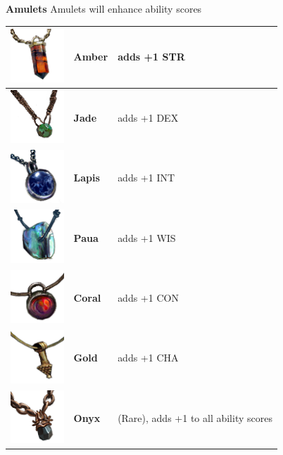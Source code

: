 

\textbf{Amulets} Amulets will enhance ability scores \\
\begin{tabular}{m{2cm}m{3cm}m{4cm} } \hline
	\includegraphics[width=2cm]{../Pictures/Gameplay/Items/Wearables/Amulets/Amber_amulet_icon.png} & \textbf{Amber} & adds +1 STR \\ \hline
	\includegraphics[width=2cm]{../Pictures/Gameplay/Items/Wearables/Amulets/Jade_amulet_icon.png} & \textbf{Jade} & adds +1 DEX \\ \hline
	\includegraphics[width=2cm]{../Pictures/Gameplay/Items/Wearables/Amulets/Lapis_amulet_icon.png} & \textbf{Lapis} & adds +1 INT \\ \hline
	\includegraphics[width=2cm]{../Pictures/Gameplay/Items/Wearables/Amulets/Paua_amulet_icon.png} & \textbf{Paua} & adds +1 WIS \\ \hline
	\includegraphics[width=2cm]{../Pictures/Gameplay/Items/Wearables/Amulets/Coral_amulet_icon.png} & \textbf{Coral} & adds +1 CON \\ \hline
	\includegraphics[width=2cm]{../Pictures/Gameplay/Items/Wearables/Amulets/Gold_amulet_icon.png} & \textbf{Gold} & adds +1 CHA \\ \hline
	\includegraphics[width=2cm]{../Pictures/Gameplay/Items/Wearables/Amulets/Onyx_amulet_icon.png} & \textbf{Onyx} & (Rare), adds +1 to all ability scores \\ \hline
\end{tabular}

\clearpage